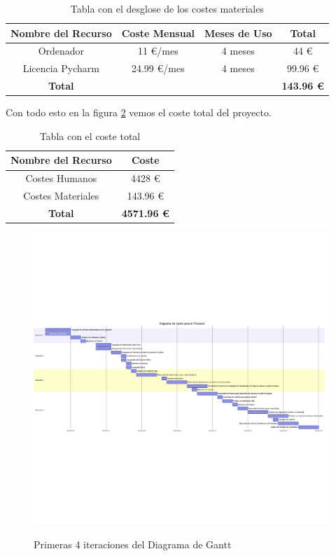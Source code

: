 \begin{table}[hp!]
   \centering
  \begin{tabular}{c|c|c|c}
  \rowcolor{udcpink!25}
  \textbf{Nombre del Recurso} & \textbf{Coste Mensual} & \textbf{Meses de Uso} & \textbf{Total}\\\hline
  
  Ordenador & 11 €/mes & 4 meses & 44 € \\
  Licencia Pycharm & 24.99 €/mes & 4 meses & 99.96 € \\
  \textbf{Total}  & & & \textbf{143.96 €} \\
  \end{tabular}

  \caption{Tabla con el desglose de los costes materiales}
  \label{tabcospes}
\end{table}

Con todo esto en la figura \ref{tabcostot} vemos el coste total del proyecto.

\begin{table}[hp!]
   \centering
  \begin{tabular}{c|c}
  \rowcolor{udcpink!25}
  \textbf{Nombre del Recurso} & \textbf{Coste} \\\hline
  
  Costes Humanos & 4428 € \\
  Costes Materiales & 143.96 €  \\
  \textbf{Total}  &  \textbf{4571.96 €} \\
  \end{tabular}

  \caption{Tabla con el coste total}
  \label{tabcostot}
\end{table}


\begin{figure}[h]
\centering
\includegraphics[width=15cm]{imaxes/gantt1.png}
\label{fig:pointnetc}
\caption{Primeras 4 iteraciones del Diagrama de Gantt}
\end{figure}

